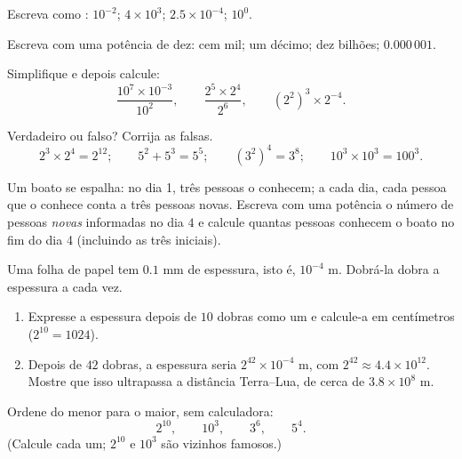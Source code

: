 \begin{exercise}[$\star$]\label{exo:g8:powers:4}
Escreva como : $10^{-2}$; \quad $4 \times 10^3$; \quad
$2.5 \times 10^{-4}$; \quad $10^0$.
\end{exercise}

\begin{exercise}[$\star$]\label{exo:g8:powers:5}
Escreva com uma potência de dez: cem mil; um décimo; dez bilhões;
$0.000\,001$.
\end{exercise}

\begin{exercise}[$\star$]\label{exo:g8:powers:6}
Simplifique e depois calcule:
\[
\frac{10^7 \times 10^{-3}}{10^2},
\qquad
\frac{2^5 \times 2^4}{2^6},
\qquad
\left(2^2\right)^3 \times 2^{-4} .
\]
\end{exercise}

\begin{exercise}[$\star$]\label{exo:g8:powers:7}
Verdadeiro ou falso? Corrija as falsas.
\[
2^3 \times 2^4 = 2^{12}; \qquad
5^2 + 5^3 = 5^5; \qquad
(3^2)^4 = 3^8; \qquad
10^3 \times 10^3 = 100^3 .
\]
\end{exercise}

\begin{exercise}[$\star\star$]\label{exo:g8:powers:8}
Um boato se espalha: no dia 1, três pessoas o conhecem; a cada dia,
cada pessoa que o conhece conta a três pessoas novas. Escreva com uma
potência o número de pessoas \emph{novas} informadas no dia $4$ e
calcule quantas pessoas conhecem o boato no fim do dia 4 (incluindo as
três iniciais).
\end{exercise}

\begin{exercise}[$\star\star$]\label{exo:g8:powers:9}
Uma folha de papel tem $0.1$ mm de espessura, isto é, $10^{-4}$ m.
Dobrá-la dobra a espessura a cada vez.
\begin{enumerate}
  \item Expresse a espessura depois de $10$ dobras como um  e
        calcule-a em centímetros ($2^{10} = 1024$).
  \item Depois de $42$ dobras, a espessura seria
        $2^{42} \times 10^{-4}$ m, com
        $2^{42} \approx 4.4 \times 10^{12}$. Mostre que isso ultrapassa
        a distância Terra--Lua, de cerca de $3.8 \times 10^8$ m.
\end{enumerate}
\end{exercise}

\begin{exercise}[$\star\star$]\label{exo:g8:powers:10}
Ordene do menor para o maior, sem calculadora:
\[
2^{10}, \qquad 10^3, \qquad 3^6, \qquad 5^4 .
\]
(Calcule cada um; $2^{10}$ e $10^3$ são vizinhos famosos.)
\end{exercise}

